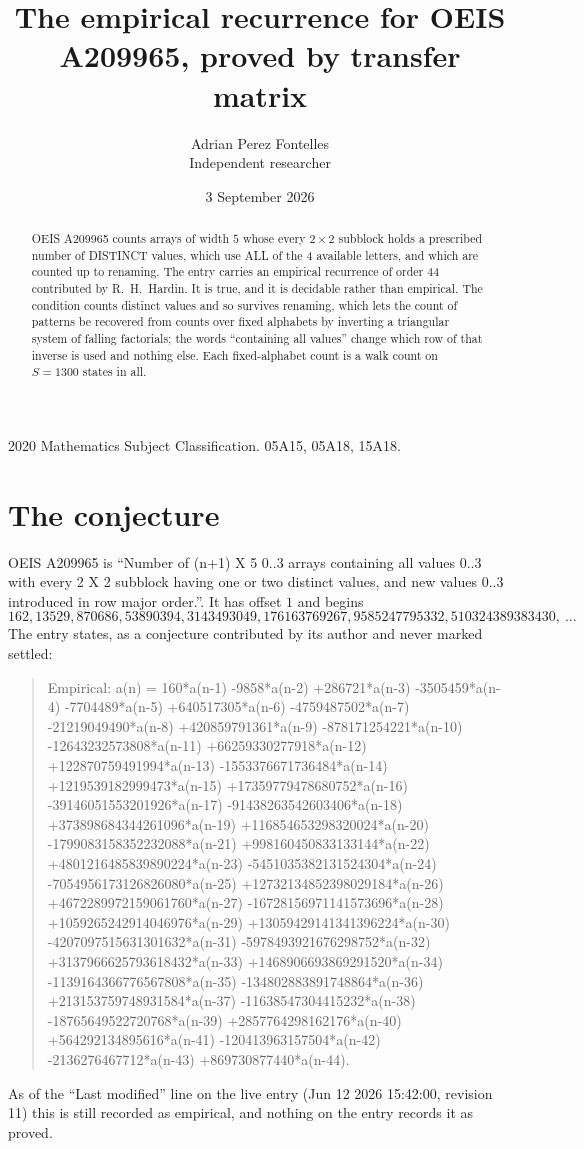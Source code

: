 \documentclass[11pt,a4paper]{article}
\title{The empirical recurrence for OEIS A209965, proved by transfer matrix}
\author{Adrian Perez Fontelles\\ \small Independent researcher}
\date{3 September 2026}
\theoremstyle{plain}
\theoremstyle{definition}
\begin{document}
\maketitle

\begin{abstract}
OEIS A209965 counts arrays of width $5$ whose every $2\times2$ subblock holds a
prescribed number of DISTINCT values, which use ALL of the $4$ available letters, and which
are counted up to renaming. The entry carries an empirical recurrence of order $44$
contributed by R.~H.~Hardin. It is true, and it is decidable rather than empirical. The
condition counts distinct values and so survives renaming, which lets the count of patterns be
recovered from counts over fixed alphabets by inverting a triangular system of falling
factorials; the words ``containing all values'' change which row of that inverse is used and
nothing else. Each fixed-alphabet count is a walk count on $S=1300$ states in all.
\end{abstract}

\noindent\small 2020 Mathematics Subject Classification. 05A15, 05A18, 15A18.\normalsize

\section{The conjecture}

OEIS A209965 is ``Number of (n+1) X 5 0..3 arrays containing all values 0..3 with every 2 X 2 subblock having one or two distinct values, and new values 0..3 introduced in row major order.''. It has offset $1$ and begins
\[
162, 13529, 870686, 53890394, 3143493049, 176163769267, 9585247795332, 510324389383430,\ \dots
\]
The entry states, as a conjecture contributed by its author and never marked settled:
\begin{quote}
Empirical: a(n) = 160*a(n-1) -9858*a(n-2) +286721*a(n-3) -3505459*a(n-4) -7704489*a(n-5) +640517305*a(n-6) -4759487502*a(n-7) -21219049490*a(n-8) +420859791361*a(n-9) -878171254221*a(n-10) -12643232573808*a(n-11) +66259330277918*a(n-12) +122870759491994*a(n-13) -1553376671736484*a(n-14) +1219539182999473*a(n-15) +17359779478680752*a(n-16) -39146051553201926*a(n-17) -91438263542603406*a(n-18) +373898684344261096*a(n-19) +116854653298320024*a(n-20) -1799083158352232088*a(n-21) +998160450833133144*a(n-22) +4801216485839890224*a(n-23) -5451035382131524304*a(n-24) -7054956173126826080*a(n-25) +12732134852398029184*a(n-26) +4672289972159061760*a(n-27) -16728156971141573696*a(n-28) +1059265242914046976*a(n-29) +13059429141341396224*a(n-30) -4207097515631301632*a(n-31) -5978493921676298752*a(n-32) +3137966625793618432*a(n-33) +1468906693869291520*a(n-34) -1139164366776567808*a(n-35) -134802883891748864*a(n-36) +213153759748931584*a(n-37) -11638547304415232*a(n-38) -18765649522720768*a(n-39) +2857764298162176*a(n-40) +564292134895616*a(n-41) -120413963157504*a(n-42) -2136276467712*a(n-43) +869730877440*a(n-44).
\end{quote}
As of the ``Last modified'' line on the live entry (Jun 12 2026 15:42:00, revision 11) this is still
recorded as empirical, and nothing on the entry records it as proved.
\end{document}
